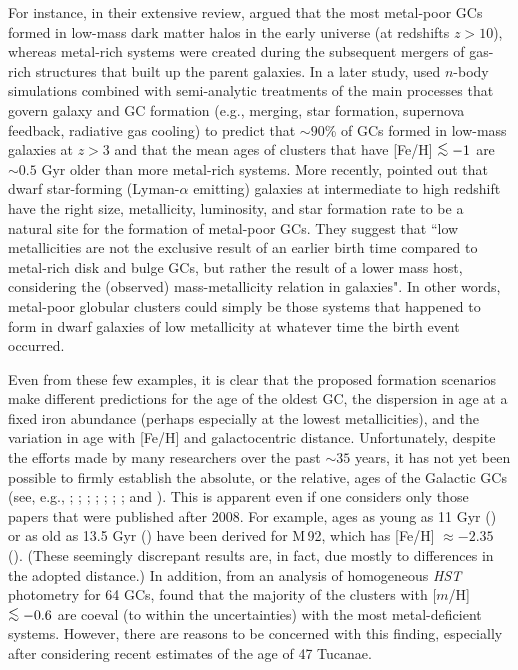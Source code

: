 \documentclass[12pt,preprint]{aastex}
\newcommand\lta{\mathrel{\hbox{\raise 0.6 ex \hbox{$<$}\kern
                   -1.8 ex\lower .5 ex\hbox{$\sim$}}}}
\begin{document}
For instance, in their extensive review, \citet{bs06} argued that the most
metal-poor GCs formed in low-mass dark matter halos in the early universe (at
redshifts $z > 10$), whereas metal-rich systems were created during the
subsequent mergers of gas-rich structures that built up the parent galaxies.
In a later study, \citet{byn08} used $n$-body simulations combined with
semi-analytic treatments of the main processes that govern galaxy and GC
formation (e.g., merging, star formation, supernova feedback, radiative gas
cooling) to predict that $\sim 90$\% of GCs formed in low-mass galaxies at
$z > 3$ and that the mean ages of clusters that have [Fe/H] $\lta -1$ are $\sim
0.5$ Gyr older than more metal-rich systems.  More recently, \citet{emr12}
pointed out that dwarf star-forming (Lyman-$\alpha$ emitting) galaxies at
intermediate to high redshift have the right size, metallicity, luminosity, and
star formation rate to be a natural site for the formation of metal-poor GCs.
They suggest that ``low metallicities are not the exclusive result of an earlier
birth time compared to metal-rich disk and bulge GCs, but rather the result of
a lower mass host, considering the (observed) mass-metallicity relation in
galaxies".  In other words, metal-poor globular clusters could simply be those
systems that happened to form in dwarf galaxies of low metallicity at whatever
time the birth event occurred.

Even from these few examples, it is clear that the proposed formation scenarios
make different predictions for the age of the oldest GC, the dispersion in age
at a fixed iron abundance (perhaps especially at the lowest metallicities), and
the variation in age with [Fe/H] and galactocentric distance.  Unfortunately,
despite the efforts made by many researchers over the past $\sim 35$ years, it
has not yet been possible to firmly establish the absolute, or the relative,
ages of the Galactic GCs (see, e.g., \citealt{vbs90}; \citealt{cds96};
\citealt{bcp98}; \citealt{ros99}; \citealt{cgc00}; \citealt{van00};
\citealt{sw02}; and \citealt{dea05}).  This is apparent even if one considers
only those papers that were published after 2008.  For example, ages as young
as 11 Gyr (\citealt{dic10}) or as old as 13.5 Gyr (\citealt{vcs10}) have been
derived for M$\,$92, which has [Fe/H] $\approx -2.35$ (\citealt[][hereafter
CBG09]{cbg09a}).  (These seemingly discrepant results are, in fact, due mostly
to differences in the adopted distance.)  In addition, from an analysis of
homogeneous {\it HST} photometry for 64 GCs, \citet[][hereafter MF09]{map09}
found that the majority of the clusters with [$m$/H] $\lta -0.6$ are coeval (to
within the uncertainties) with the most metal-deficient systems.  However, there
are reasons to be concerned with this finding, especially after considering
recent estimates of the age of 47 Tucanae.
\end{document}
